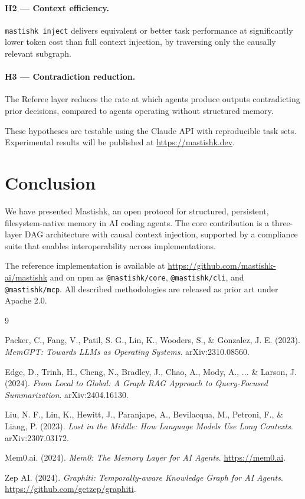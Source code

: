 \documentclass[11pt]{article}
\begin{document}
\paragraph{H2 --- Context efficiency.}
\texttt{mastishk inject} delivers equivalent or better task performance at significantly lower token cost than full context injection, by traversing only the causally relevant subgraph.

\paragraph{H3 --- Contradiction reduction.}
The Referee layer reduces the rate at which agents produce outputs contradicting prior decisions, compared to agents operating without structured memory.

These hypotheses are testable using the Claude API with reproducible task sets. Experimental results will be published at \url{https://mastishk.dev}.

\section{Conclusion}

We have presented Mastishk, an open protocol for structured, persistent, filesystem-native memory in AI coding agents. The core contribution is a three-layer DAG architecture with causal context injection, supported by a compliance suite that enables interoperability across implementations.

The reference implementation is available at \url{https://github.com/mastishk-ai/mastishk} and on npm as \texttt{@mastishk/core}, \texttt{@mastishk/cli}, and \texttt{@mastishk/mcp}. All described methodologies are released as prior art under Apache 2.0.


\begin{thebibliography}{9}

Packer, C., Fang, V., Patil, S. G., Lin, K., Wooders, S., \& Gonzalez, J. E. (2023).
\textit{MemGPT: Towards LLMs as Operating Systems}.
arXiv:2310.08560.

Edge, D., Trinh, H., Cheng, N., Bradley, J., Chao, A., Mody, A., ... \& Larson, J. (2024).
\textit{From Local to Global: A Graph RAG Approach to Query-Focused Summarization}.
arXiv:2404.16130.

Liu, N. F., Lin, K., Hewitt, J., Paranjape, A., Bevilacqua, M., Petroni, F., \& Liang, P. (2023).
\textit{Lost in the Middle: How Language Models Use Long Contexts}.
arXiv:2307.03172.

Mem0.ai. (2024). \textit{Mem0: The Memory Layer for AI Agents}.
\url{https://mem0.ai}.

Zep AI. (2024). \textit{Graphiti: Temporally-aware Knowledge Graph for AI Agents}.
\url{https://github.com/getzep/graphiti}.

\end{thebibliography}
\end{document}
